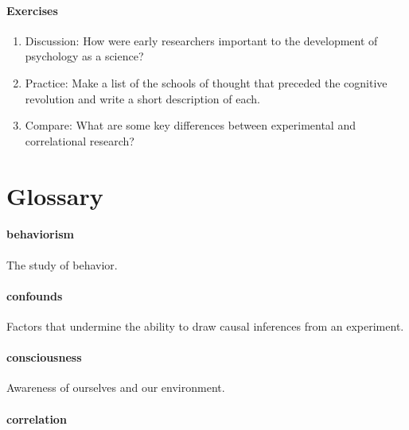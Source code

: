 \documentclass[
]{krantz}
\providecommand{\tightlist}{%
  \setlength{\itemsep}{0pt}\setlength{\parskip}{0pt}}
\begin{document}
\paragraph*{Exercises}\label{exercises}

\begin{enumerate}
\def\labelenumi{\arabic{enumi}.}
\tightlist
\item
  Discussion: How were early researchers important to the development of psychology as a science?
\item
  Practice: Make a list of the schools of thought that preceded the cognitive revolution and write a short description of each.
\item
  Compare: What are some key differences between experimental and correlational research?
\end{enumerate}

\section{Glossary}\label{glossary}

\paragraph*{behaviorism}\label{behaviorism}

The study of behavior.

\paragraph*{confounds}\label{confounds}

Factors that undermine the ability to draw causal inferences from an experiment.

\paragraph*{consciousness}\label{consciousness}

Awareness of ourselves and our environment.

\paragraph*{correlation}\label{correlation}
\end{document}
